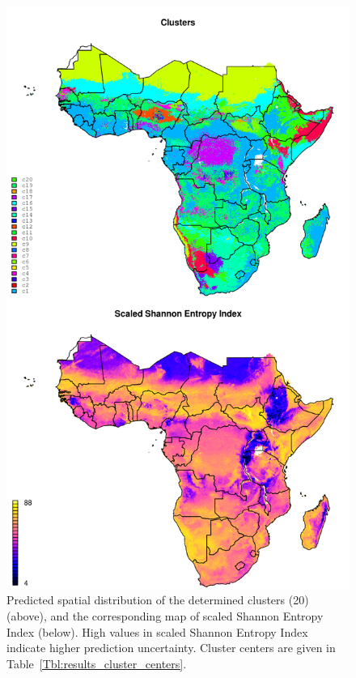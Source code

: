 \begin{linenumbers}
\begin{figure}[!hp]
\includegraphics[width=.95\textwidth]{Fig_nutrient_clusters_map.png}
\caption{Predicted spatial distribution of the determined clusters (20) (above), and the corresponding map of scaled Shannon Entropy Index (below). High values in scaled Shannon Entropy Index indicate higher prediction uncertainty. Cluster centers are given in Table~\ref{Tbl:results_cluster_centers}.}
\label{fig:nutrient_clusters_map}
\end{figure}

\clearpage


\end{linenumbers}
